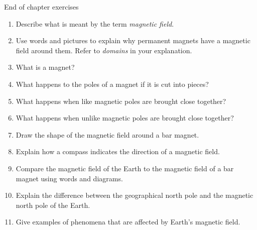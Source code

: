  \begin{eocexercises}{ End of chapter exercises}
            \nopagebreak
      \label{m37830*id129746}\begin{enumerate}[noitemsep, label=\textbf{\arabic*}. ] 
            \label{m37830*uid28}\item Describe what is meant by the term \textsl{magnetic field}.\newline
\label{m37830*uid29}\item Use words and pictures to explain why permanent magnets have a magnetic field around them. Refer to \textsl{domains} in your explanation.\newline
\label{m37830*uid30}\item What is a magnet?\newline
\label{m37830*uid31}\item What happens to the poles of a magnet if it is cut into pieces?\newline
\label{m37830*uid32}\item What happens when like magnetic poles are brought close together?\newline
\label{m37830*uid33}\item What happens when unlike magnetic poles are brought close together?\newline
\label{m37830*uid34}\item Draw the shape of the magnetic field around a bar magnet.\newline
\label{m37830*uid35}\item Explain how a compass indicates the direction of a magnetic field.\newline
\label{m37830*uid36}\item Compare the magnetic field of the Earth to the magnetic field of a bar magnet using words and diagrams.\newline
\label{m37830*uid37}\item Explain the difference between the geographical north pole and the magnetic north pole of the Earth.\newline
\label{m37830*uid38}\item Give examples of phenomena that are affected by Earth's magnetic field.\newline

\end{enumerate}
\end{eocexercises}
